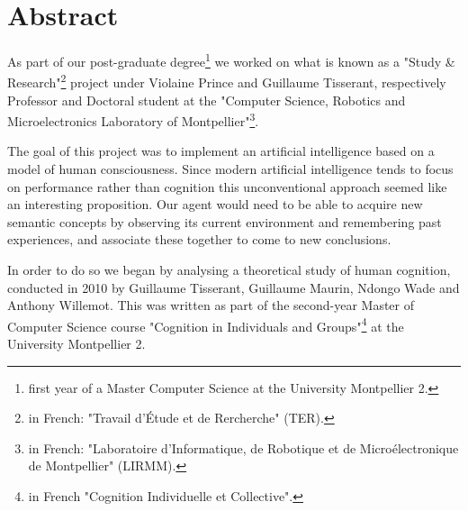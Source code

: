\chapter*{Abstract}

As part of our post-graduate degree\footnote{first year of a Master Computer Science at the University Montpellier 2.} we worked on what is known as a "Study \& Research"\footnote{in French: "Travail d'Étude et de Rercherche" (TER).} project under \mbox{Violaine} \mbox{Prince} and \mbox{Guillaume} \mbox{Tisserant}, respectively Professor and Doctoral student at the "Computer Science, Robotics and Microelectronics Laboratory of Montpellier"\footnote{in French: "Laboratoire d'Informatique, de Robotique et de Microélectronique de Montpellier" (LIRMM).}. 

The goal of this project was to implement an artificial intelligence based on a model of human consciousness. Since modern artificial intelligence tends to focus on performance rather than cognition this unconventional approach seemed like an interesting proposition. 
Our agent would need to be able to acquire new semantic concepts by observing its current environment and remembering past experiences, and associate these together to come to new conclusions. 

In order to do so we began by analysing a theoretical study of human cognition, conducted in 2010 by \mbox{Guillaume} \mbox{Tisserant}, \mbox{Guillaume} \mbox{Maurin}, \mbox{Ndongo} \mbox{Wade} and \mbox{Anthony} \mbox{Willemot}. This was written as part of the second-year Master of Computer Science course "Cognition in Individuals and Groups"\footnote{in French "Cognition Individuelle et Collective".} at the University Montpellier 2.
